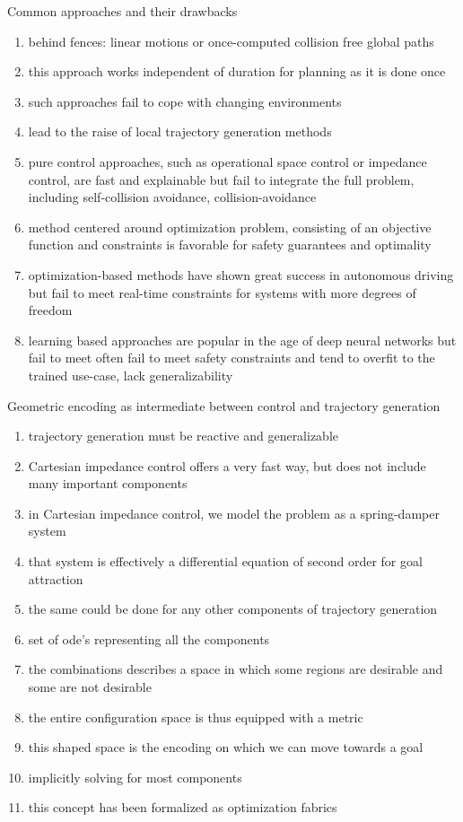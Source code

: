 Common approaches and their drawbacks
\begin{enumerate}
  \item behind fences: linear motions or once-computed collision free global paths
  \item this approach works independent of duration for planning as it is done
  once
  \item such approaches fail to cope with changing environments
  \item lead to the raise of local trajectory generation methods
  \item pure control approaches, such as operational space control or impedance
  control, are fast and explainable but fail to integrate the full problem,
  including self-collision avoidance, collision-avoidance
  \item method centered around optimization problem, consisting of an objective
  function and constraints is favorable for safety guarantees and optimality
  \item optimization-based methods have shown great success in autonomous driving
  but fail to meet real-time constraints for systems with more degrees of
  freedom
  \item learning based approaches are popular in the age of deep neural networks
  but fail to meet often fail to meet safety constraints and tend to overfit
  to the trained use-case, lack generalizability
\end{enumerate}
Geometric encoding as intermediate between control and trajectory generation
\begin{enumerate}
  \item trajectory generation must be reactive and generalizable
  \item Cartesian impedance control offers a very fast way, but does not include
  many important components
  \item in Cartesian impedance control, we model the problem as a spring-damper
  system
  \item that system is effectively a differential equation of second order for
  goal attraction
  \item the same could be done for any other components of trajectory generation
  \item set of ode's representing all the components
  \item the combinations describes a space in which some regions are desirable
  and some are not desirable
  \item the entire configuration space is thus equipped with a metric
  \item this shaped space is the encoding on which we can move towards a goal
  \item implicitly solving for most components
  \item this concept has been formalized as optimization fabrics
\end{enumerate}
